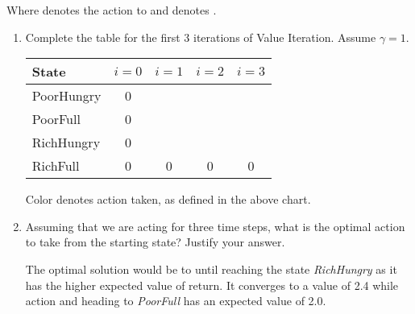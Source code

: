 \documentclass[12pt]{article}
\begin{document}
\begin{center}

Where {\color{red}{red}} denotes the action to {\color{red}{Eat}} and {\color{blue}{blue}} denotes {\color{blue}{Play}}.
\end{center}

\newpage
\begin{enumerate}

\item Complete the table for the first 3 iterations of Value
  Iteration. Assume $\gamma = 1$.

\begin{center}
\begin{tabular}{|l|c|c|c|c|} \hline
State      & $i=0$ & $i=1$ & $i=2$ & $i=3$ \\ \hline \hline
PoorHungry & 0     & {\color{red}{$1.0$}}&{\color{red}{$1.0$}}&{\color{red}{$1.0$}}\\ \hline
PoorFull   & 0     & {\color{blue}{$3.0$}}&{\color{blue}{$2.0$}}&{\color{blue}{$2.0$}}\\ \hline
RichHungry & 0     & {\color{red}{$4.0$}}&{\color{red}{$2.4$}}&{\color{red}{$2.4$}}\\ \hline
RichFull   & 0     & 0     & 0     & 0     \\ \hline
\end{tabular}
\end{center}

Color denotes action taken, as defined in the above chart.

\item Assuming that we are acting for three time steps, what is the
  optimal action to take from the starting state? Justify your answer.

The optimal solution would be to {\color{blue}{Play}} until reaching the state {\em RichHungry} as it has the higher expected value of return. It converges to a value of 2.4 while {\color{red}{Eat}} action and heading to {\em PoorFull} has an expected value of 2.0.

\end{enumerate}
\end{document}

